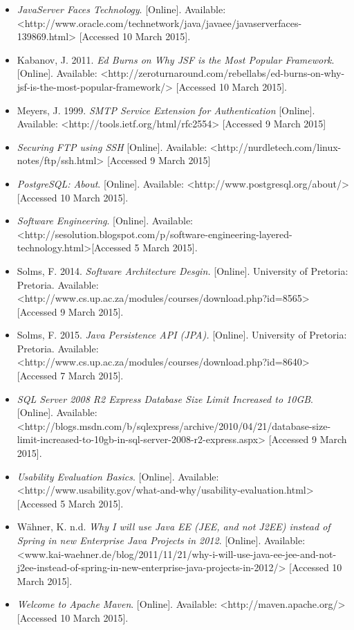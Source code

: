 \documentclass[a4paper,12pt]{article}
\begin{document}
\begin{itemize}
			\item \textit{JavaServer Faces Technology}. [Online]. Available: <http://www.oracle.com/technetwork/java/javaee/javaserverfaces-139869.html> [Accessed 10 March 2015].

			\item Kabanov, J. 2011. \textit{Ed Burns on Why JSF is the Most Popular Framework}. [Online]. Available: <http://zeroturnaround.com/rebellabs/ed-burns-on-why-jsf-is-the-most-popular-framework/> [Accessed 10 March 2015].
			\item Meyers, J. 1999. \textit{SMTP Service Extension for Authentication} [Online]. Available: <http://tools.ietf.org/html/rfc2554> [Accessed 9 March 2015]

			\item \textit{Securing FTP using SSH} [Online]. Available: <http://nurdletech.com/linux-notes/ftp/ssh.html> [Accessed 9 March 2015]

			\item \textit{PostgreSQL: About}. [Online]. Available: <http://www.postgresql.org/about/> [Accessed 10 March 2015].
			
			\item \textit{Software Engineering}. [Online]. Available: <http://sesolution.blogspot.com/p/software-engineering-layered-technology.html>[Accessed 5 March 2015].
								
			\item Solms, F. 2014. \textit{Software Architecture Desgin.} [Online]. University of Pretoria: Pretoria. Available: <http://www.cs.up.ac.za/modules/courses/download.php?id=8565> [Accessed 9 March 2015].
			
			\item Solms, F. 2015. \textit{Java Persistence API (JPA).} [Online]. University of Pretoria: Pretoria. Available: <http://www.cs.up.ac.za/modules/courses/download.php?id=8640> [Accessed 7 March 2015].
			
			\item \textit{SQL Server 2008 R2 Express Database Size Limit Increased to 10GB}. [Online]. Available: <http://blogs.msdn.com/b/sqlexpress/archive/2010/04/21/database-size-limit-increased-to-10gb-in-sql-server-2008-r2-express.aspx> [Accessed 9 March 2015].
			
			\item \textit{Usability Evaluation Basics}. [Online]. Available: <http://www.usability.gov/what-and-why/usability-evaluation.html> [Accessed 5 March 2015].

			\item Wähner, K. n.d. \textit{Why I will use Java EE (JEE, and not J2EE) instead of Spring in new Enterprise Java Projects in 2012}. [Online]. Available: <www.kai-waehner.de/blog/2011/11/21/why-i-will-use-java-ee-jee-and-not-j2ee-instead-of-spring-in-new-enterprise-java-projects-in-2012/> [Accessed 10 March 2015].		

			\item \textit{Welcome to Apache Maven}. [Online]. Available: <http://maven.apache.org/> [Accessed 10 March 2015].
			
			

			

		\end{itemize}
\end{document}
